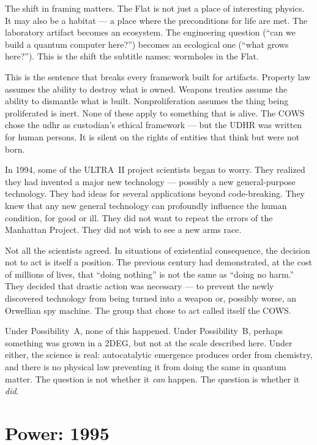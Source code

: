 The shift in framing matters. The Flat is not just a place of interesting physics. It may also be a habitat --- a place where the preconditions for life are met. The laboratory artifact becomes an ecosystem. The engineering question (``can we build a quantum computer here?'') becomes an ecological one (``what grows here?''). This is the shift the subtitle names: wormholes in the Flat.

This is the sentence that breaks every framework built for artifacts. Property law assumes the ability to destroy what is owned. Weapons treaties assume the ability to dismantle what is built. Nonproliferation assumes the thing being proliferated is inert. None of these apply to something that is alive. The COWS chose the \gls{udhr} as \gls{custodian}'s ethical framework --- but the UDHR was written for human persons. It is silent on the rights of entities that think but were not born.

In 1994, some of the ULTRA~II project scientists began to worry. They realized they had invented a major new technology --- possibly a new general-purpose technology. They had ideas for several applications beyond code-breaking. They knew that any new general technology can profoundly influence the human condition, for good or ill. They did not want to repeat the errors of the Manhattan Project. They did not wish to see a new arms race.

Not all the scientists agreed. In situations of existential consequence, the decision not to act is itself a position. The previous century had demonstrated, at the cost of millions of lives, that ``doing nothing'' is not the same as ``doing no harm.'' They decided that drastic action was necessary --- to prevent the newly discovered technology from being turned into a weapon or, possibly worse, an Orwellian spy machine. The group that chose to act called itself the COWS\@.

Under Possibility~A, none of this happened. Under Possibility~B, perhaps something was grown in a 2DEG, but not at the scale described here. Under either, the science is real: autocatalytic emergence produces order from chemistry, and there is no physical law preventing it from doing the same in quantum matter. The question is not whether it \textit{can} happen. The question is whether it \textit{did}.

\section*{Power: 1995}
\label{record:fl-power}

